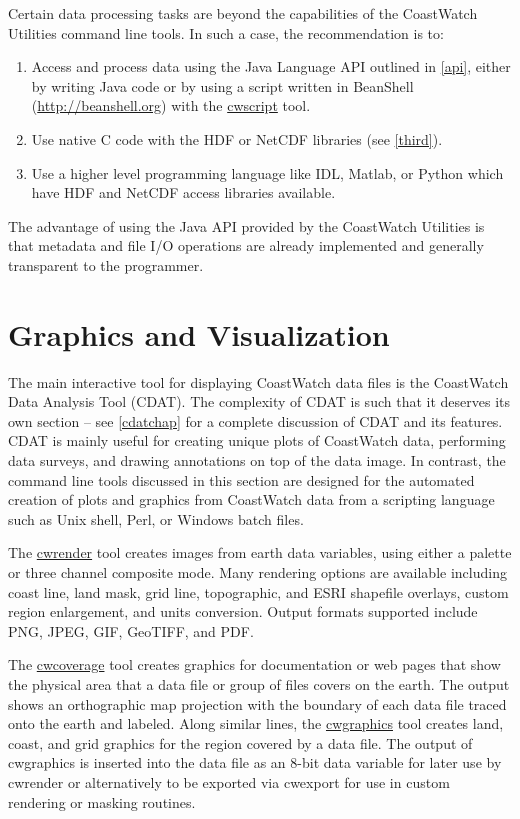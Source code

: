 Certain data processing tasks are beyond the capabilities of the
CoastWatch Utilities command line tools.  In such a case, the recommendation
is to:
\begin{enumerate}

\item Access and process data using the Java Language API
outlined in \autoref{api}, either by writing Java code or by using a script 
written in BeanShell (\url{http://beanshell.org}) with the 
\hyperlink{cwscript}{cwscript} tool.

\item Use native C code with the HDF or NetCDF libraries (see \autoref{third}).

\item Use a higher level programming language like IDL, Matlab, or Python 
which have HDF and NetCDF access libraries available.

\end{enumerate}
The advantage of using the Java API provided by the CoastWatch
Utilities is that metadata and file I/O operations are already
implemented and generally transparent to the programmer.

\section{Graphics and Visualization}

The main interactive tool for displaying CoastWatch data files is the
CoastWatch Data Analysis Tool (CDAT).  The complexity of CDAT is such
that it deserves its own section -- see \autoref{cdatchap} for a
complete discussion of CDAT and its features.  CDAT is mainly useful
for creating unique plots of CoastWatch data, performing data
surveys, and drawing annotations on top of the data image.  In
contrast, the command line tools discussed in this section are designed
for the automated creation of plots and graphics from CoastWatch data
from a scripting language such as Unix shell, Perl, or Windows batch
files.

The \hyperlink{cwrender}{cwrender} tool creates images from earth data
variables, using either a palette or three channel composite mode.
Many rendering options are available including coast line, land mask,
grid line, topographic, and ESRI shapefile overlays, custom region
enlargement, and units conversion.  Output formats supported include
PNG, JPEG, GIF, GeoTIFF, and PDF.

The \hyperlink{cwcoverage}{cwcoverage} tool creates
graphics for documentation or web pages that show the physical area
that a data file or group of files covers on the earth.  The output
shows an orthographic map projection with the boundary of each data
file traced onto the earth and labeled.  Along similar lines, the
\hyperlink{cwgraphics}{cwgraphics} tool creates land, coast, and grid 
graphics for the region covered by a data file.  The output of
cwgraphics is inserted into the data file as an 8-bit data variable
for later use by cwrender or alternatively to be exported via cwexport
for use in custom rendering or masking routines.

